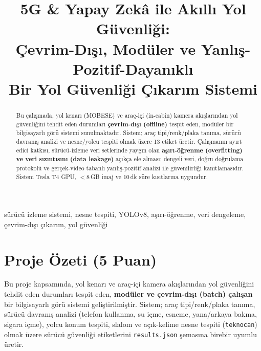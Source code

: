 \documentclass[onecolumn,11pt]{IEEEtran}
\begin{document}
\title{5G \& Yapay Zekâ ile Akıllı Yol Güvenliği:\\
Çevrim-Dışı, Modüler ve Yanlış-Pozitif-Dayanıklı\\ Bir Yol Güvenliği Çıkarım Sistemi}

\author{
}

\maketitle

\begin{abstract}
Bu çalışmada, yol kenarı (MOBESE) ve araç-içi (in-cabin) kamera akışlarından
yol güvenliğini tehdit eden durumları \textbf{çevrim-dışı (offline)} tespit eden,
modüler bir bilgisayarlı görü sistemi sunulmaktadır. Sistem; araç tipi/renk/plaka
tanıma, sürücü davranış analizi ve nesne/yolcu tespiti olmak üzere 13 etiket
üretir. Çalışmanın ayırt edici katkısı, sürücü-izleme veri setlerinde yaygın olan
\textbf{aşırı-öğrenme (overfitting) ve veri sızıntısını (data leakage)} açıkça
ele alması; dengeli veri, doğru doğrulama protokolü ve gerçek-video tabanlı
yanlış-pozitif analizi ile güvenilirliği kanıtlamasıdır. Sistem Tesla T4 GPU,
$<$8\,GB imaj ve 10\,dk süre kısıtlarına uygundur.
\end{abstract}

\begin{IEEEkeywords}
sürücü izleme sistemi, nesne tespiti, YOLOv8, aşırı-öğrenme, veri dengeleme,
çevrim-dışı çıkarım, yol güvenliği
\end{IEEEkeywords}

\section{Proje Özeti (5 Puan)}
Bu proje kapsamında, yol kenarı ve araç-içi kamera akışlarından yol güvenliğini
tehdit eden durumları tespit eden, \textbf{modüler ve çevrim-dışı (batch)
çalışan} bir bilgisayarlı görü sistemi geliştirilmiştir. Sistem; araç
tipi/renk/plaka tanıma, sürücü davranış analizi (telefon kullanma, su içme,
esneme, yana/arkaya bakma, sigara içme), yolcu konum
tespiti, slalom ve açık-kelime nesne tespiti (\texttt{teknocan}) olmak üzere
sürücü güvenliği etiketlerini \texttt{results.json} şemasına birebir uyumlu üretir.
\end{document}
